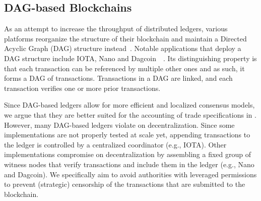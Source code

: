 
\subsection{DAG-based Blockchains}
As an attempt to increase the throughput of distributed ledgers, various platforms reorganize the structure of their blockchain and maintain a Directed Acyclic Graph (DAG) structure instead~\cite{sompolinsky2018phantom}.
Notable applications that deploy a DAG structure include IOTA, Nano and Dagcoin~\cite{popov2016tangle}~\cite{lerner2015dagcoin}.
Its distinguishing property is that each transaction can be referenced by multiple other ones and as such, it forms a DAG of transactions.
Transactions in a DAG are linked, and each transaction verifies one or more prior transactions.

Since DAG-based ledgers allow for more efficient and localized consensus models, we argue that they are better suited for the accounting of trade specifications in \ModelName{}.
However, many DAG-based ledgers violate on decentralization.
Since some implementations are not properly tested at scale yet, appending transactions to the ledger is controlled by a centralized coordinator (e.g., IOTA).
Other implementations compromise on decentralization by assembling a fixed group of witness nodes that verify transactions and include them in the ledger (e.g., Nano and Dagcoin).
We specifically aim to avoid authorities with leveraged permissions to prevent (strategic) censorship of the transactions that are submitted to the \ModelName{} blockchain.

